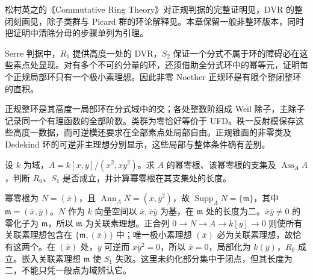 \ProseParagraphBreak
松村英之的《Commutative Ring Theory》对正规判据的完整证明见\cite[Theorem 23.8, pp. 183--184]{Matsumura1989CommutativeRingTheory}，DVR 的整闭刻画见\cite[Theorem 11.2, pp. 79--80]{Matsumura1989CommutativeRingTheory}，除子类群与 Picard 群的环论解释见\cite[\S20, pp. 165--167]{Matsumura1989CommutativeRingTheory}。本章保留一般非整环版本，同时把证明中清除分母的步骤单列为引理。







\begin{chaptersummary}
	Serre 判据中，\(R_1\) 提供高度一处的 DVR，\(S_2\) 保证一个分式不属于环的障碍必在这些素点处显现。对有多个不可约分量的环，还须借助全分式环中的幂等元，证明每个正规局部环只有一个极小素理想。因此非零 Noether 正规环是有限个整闭整环的直积。

	\ProseParagraphBreak
	正规整环是其高度一局部环在分式域中的交；各处整数阶组成 Weil 除子，主除子记录同一个有理函数的全部阶数。类群为零恰好等价于 UFD。秩一反射模保存这些高度一数据，而可逆模还要求在全部素点处局部自由。正规锥面的非零类及 Dedekind 环的可逆非主理想分别显示，这些局部与整体条件确有差别。
\end{chaptersummary}

\BookExercises

\begin{exercise}\label{b3:ex:20-r0-s1-tests}
	设 \(k\) 为域，\(A=k[x,y]/(x^2,xy^2)\)。求 \(A\) 的幂零根、该幂零根的支集及 \(\operatorname{Ass}_AA\)，判断 \(R_0\)、\(S_1\) 是否成立，并计算幂零根在其支集处的长度。
\end{exercise}
\begin{solution}
	幂零根为 \(N=(\bar x)\)，且 \(\operatorname{Ann}_AN=(\bar x,\bar y^2)\)，故 \(\operatorname{Supp}_AN=\{\mathfrak m\}\)，其中 \(\mathfrak m=(\bar x,\bar y)\)。\(N\) 作为 \(k\) 向量空间以 \(\bar x,\bar x\bar y\) 为基，在 \(\mathfrak m\) 处的长度为二。\(\bar x\bar y\ne0\) 的零化子为 \(\mathfrak m\)，所以 \(\mathfrak m\) 为关联素理想。正合列 \(0\to N\to A\to k[y]\to0\) 则使所有关联素理想包含在 \(\{\mathfrak m,(\bar x)\}\) 中；唯一极小素理想 \((\bar x)\) 必为关联素理想，故恰有这两个。在 \((\bar x)\) 处，\(y\) 可逆而 \(xy^2=0\)，所以 \(\bar x=0\)，局部化为 \(k(y)\)，\(R_0\) 成立。嵌入关联素理想 \(\mathfrak m\) 使 \(S_1\) 失败。这里未约化部分集中于闭点，但其长度为二，不能只凭一般点为域辨认它。
\end{solution}

